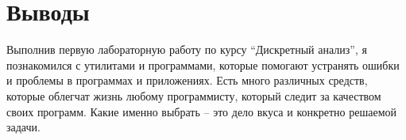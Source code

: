 \section{Выводы}
Выполнив первую лабораторную работу по курсу \enquote{Дискретный анализ}, я познакомился с утилитами и программами, которые помогают устранять ошибки и проблемы в программах и приложениях. Есть много различных средств, которые облегчат жизнь любому программисту, который следит за качеством своих программ. Какие именно выбрать -- это дело вкуса и конкретно решаемой задачи.
\pagebreak